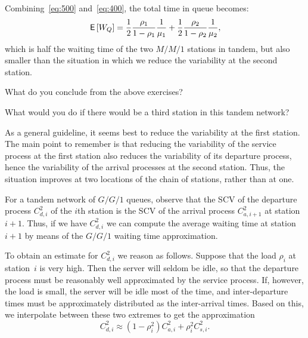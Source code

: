 \begin{exercise}
\begin{solution}
Combining~\cref{eq:500} and~\cref{eq:400}, the total time in queue becomes:
\begin{equation*}
 \,\mathsf{E}\left[W_Q\right]= \frac12\frac{\rho_1}{1-\rho_1} \frac1{\mu_1} +
 \frac12\frac{\rho_2}{1-\rho_2} \frac1{\mu_2}, 
\end{equation*}
which is half the waiting time of the two $M/M/1$ stations in tandem, but also smaller than the situation in which we reduce the variability at the second station.
\end{solution}
\end{exercise}

\begin{exercise}
 What do you conclude from the above exercises?
\begin{hint}
 What would you do if there would be a third station in this tandem network?
\end{hint}
\begin{solution}
As a general guideline, it seems best to reduce the
variability at the first station. The main point to remember is that
reducing the variability of the service process at the first station
also reduces the variability of its departure process, hence the
variability of the arrival processes at the second station. Thus, the
situation improves at two locations of the chain of stations, rather
than at one.
\end{solution}
\end{exercise}

For a tandem network of $G/G/1$ queues, observe that the SCV of the departure process $C_{d,i}^2$ of the $i$th station is the SCV of the arrival process $C_{a,i+1}^2$ at station $i+1$. Thus, if we have $C_{d,i}^2$ we can compute the average waiting time at station~$i+1$ by means of the $G/G/1$ waiting time approximation. 

To obtain an estimate for $C_{d,i}^2$ we reason as follows.
Suppose that the load $\rho_i$ at station~$i$ is very high.
Then the server will seldom be idle, so that the departure process must be reasonably well approximated by the service process.
If, however, the load is small, the server will be idle most of the time, and inter-departure times must be approximately distributed as the inter-arrival times.
Based on this, we interpolate between these two extremes to get the approximation
\begin{equation}
 \label{eq:40}
 C_{d,i}^2 \approx (1-\rho_i^2) C_{a,i}^2 + \rho_i^2 C_{s,i}^2.
\end{equation}


